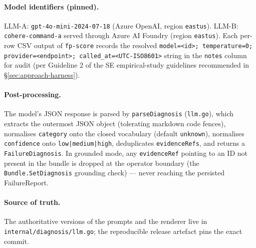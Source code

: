 \documentclass[sigconf, nonacm=true, anonymous=false, review=false]{acmart}
\newcommand{\artifactname}[1]{\nolinkurl{#1}}
\newcommand{\fp}{FailureReport\xspace}
\begin{document}
\paragraph{Model identifiers (pinned).}
LLM-A: \texttt{gpt-4o-mini-2024-07-18} (Azure OpenAI, region
\texttt{eastus}). LLM-B: \texttt{cohere-command-a} served through
Azure AI Foundry (region \texttt{eastus}). Each per-row CSV
output of \texttt{fp-score} records the resolved
\texttt{model=<id>; temperature=0; provider=<endpoint>;
called\_at=<UTC-ISO8601>} string in the \texttt{notes} column for
audit (per Guideline 2 of the SE empirical-study guidelines
recommended in §\ref{sec:approach-harness}).

\paragraph{Post-processing.} The model's JSON response is parsed
by \texttt{parseDiagnosis} (\texttt{llm.go}), which extracts the
outermost JSON object (tolerating markdown code fences), normalises
\texttt{category} onto the closed vocabulary (default
\texttt{unknown}), normalises \texttt{confidence} onto
\texttt{low|medium|high}, deduplicates \texttt{evidenceRefs}, and
returns a \texttt{FailureDiagnosis}. In grounded mode, any
\texttt{evidenceRef} pointing to an ID not present in the bundle
is dropped at the operator boundary (the
\texttt{Bundle.SetDiagnosis} grounding check) --- never reaching
the persisted \fp{}.

\paragraph{Source of truth.} The authoritative versions of the
prompts and the renderer live in
\artifactname{internal/diagnosis/llm.go}; the reproducible release
artefact pins the exact commit.



\end{document}
